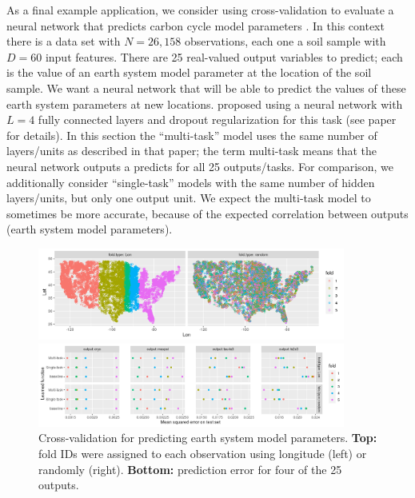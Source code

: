 \documentclass[12pt]{article}
\begin{document}
As a final example application, we consider using cross-validation to
evaluate a neural network that predicts carbon cycle model parameters
\citep{Feng2020}. In this context there is a data set with $N=26,158$
observations, each one a soil sample with $D=60$ input features.
There
are 25 real-valued output variables to predict; each is the value of
an earth system model parameter at the location of the soil sample. We
want a neural network that will be able to predict the values of these
earth system parameters at new locations. \citet{Feng2020} proposed
using a neural network with $L=4$ fully connected layers and dropout
regularization for this task (see paper for details). In this section
the ``multi-task'' model uses the same number of layers/units as
described in that paper; the term multi-task means that the neural
network outputs a predicts for all 25 outputs/tasks. For comparison,
we additionally consider ``single-task'' models with the same number
of hidden layers/units, but only one output unit. We expect the
multi-task model to sometimes be more accurate, because of the
expected correlation between outputs (earth system model parameters).

\begin{figure}
  \centering
  \includegraphics[width=0.9\textwidth]{figure-proda-cv-data-map}

  \includegraphics[width=0.9\textwidth]{figure-proda-cv-some-out}
    
  \caption{Cross-validation for predicting earth system model
    parameters. \textbf{Top:} fold IDs were assigned to each
    observation using longitude (left) or randomly
    (right). \textbf{Bottom:} prediction error for four of the 25
    outputs.}
  \label{fig:proda-cv}
\end{figure}
\end{document}
